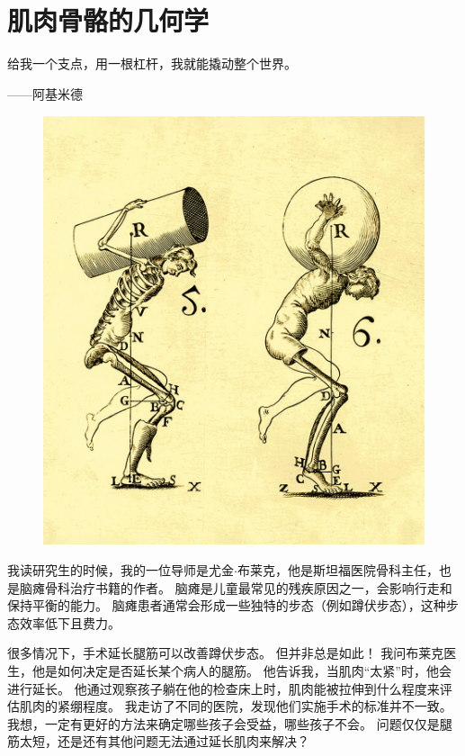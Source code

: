 \chapter{肌肉骨骼的几何学} \label{chap:chap6}


给我一个支点，用一根杠杆，我就能撬动整个世界。

\begin{flushright}
	——阿基米德
\end{flushright}


\begin{figure}[!htb]
	\centering
	\includegraphics[width=1.0\linewidth]{chap6/6_0}
	\caption*{ \label{fig:6_0}}
\end{figure}


我读研究生的时候，我的一位导师是尤金$\cdot$布莱克，他是斯坦福医院骨科主任，也是脑瘫骨科治疗书籍的作者。
脑瘫是儿童最常见的残疾原因之一，会影响行走和保持平衡的能力。
脑瘫患者通常会形成一些独特的步态（例如蹲伏步态），这种步态效率低下且费力。


很多情况下，手术延长腿筋可以改善蹲伏步态。
但并非总是如此！
我问布莱克医生，他是如何决定是否延长某个病人的腿筋。
他告诉我，当肌肉“太紧”时，他会进行延长。
他通过观察孩子躺在他的检查床上时，肌肉能被拉伸到什么程度来评估肌肉的紧绷程度。
我走访了不同的医院，发现他们实施手术的标准并不一致。
我想，一定有更好的方法来确定哪些孩子会受益，哪些孩子不会。
问题仅仅是腿筋太短，还是还有其他问题无法通过延长肌肉来解决？


